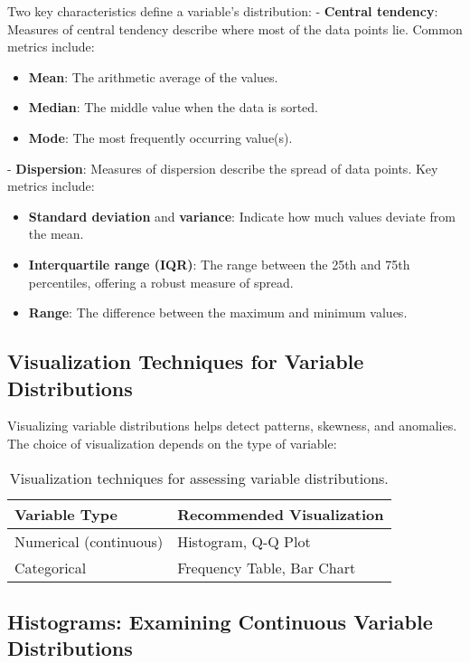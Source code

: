 \documentclass[12pt,openany]{book}
\begin{document}
Two key characteristics define a variable’s distribution:  
- \textbf{Central tendency}: Measures of central tendency describe where most of the data points lie. Common metrics include:
  \begin{itemize}
      \item \textbf{Mean}: The arithmetic average of the values.
      \item \textbf{Median}: The middle value when the data is sorted.
      \item \textbf{Mode}: The most frequently occurring value(s).
  \end{itemize}
- \textbf{Dispersion}: Measures of dispersion describe the spread of data points. Key metrics include:
  \begin{itemize}
      \item \textbf{Standard deviation} and \textbf{variance}: Indicate how much values deviate from the mean.
      \item \textbf{Interquartile range (IQR)}: The range between the 25th and 75th percentiles, offering a robust measure of spread.
      \item \textbf{Range}: The difference between the maximum and minimum values.
  \end{itemize}

\subsection{Visualization Techniques for Variable Distributions}

Visualizing variable distributions helps detect patterns, skewness, and anomalies. The choice of visualization depends on the type of variable:

\begin{table}[h]
    \centering
    \begin{tabular}{|l|l|}
        \hline
        \textbf{Variable Type} & \textbf{Recommended Visualization} \\
        \hline
        Numerical (continuous) & Histogram, Q-Q Plot \\
        Categorical & Frequency Table, Bar Chart \\
        \hline
    \end{tabular}
    \caption{Visualization techniques for assessing variable distributions.}
    \label{tab:viz_variable_distributions}
\end{table}


\subsection{Histograms: Examining Continuous Variable Distributions}
\end{document}

